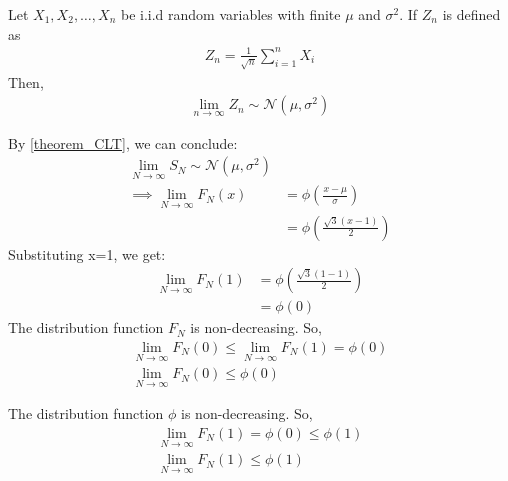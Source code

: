 \documentclass[journal,12pt,twocolumn]{IEEEtran}
\begin{document}
\begin{theorem}\label{theorem_CLT}
Let $X_1,X_2,\dots,X_n$ be i.i.d random variables with finite $\mu$ and $\sigma^2$. If $Z_n$ is defined as
\begin{align}
  Z_n = \frac{1}{\sqrt{n}} \sum_{i=1}^n X_i
 \end{align}
Then,
\begin{align}
   \lim_{n \to \infty} Z_n \sim \mathcal N(\mu,\sigma^2)
\end{align}

\end{theorem}
By \eqref{theorem_CLT}, we can conclude:
\begin{align}
\lim_{N\to\infty} S_N \sim \mathcal N(\mu,\sigma^2)\\
\implies \lim_{N\to\infty} F_N(x) &= \phi\left(\frac{x-\mu}{\sigma}\right)\\
&= \phi\left(\frac{\sqrt{3}(x-1)}{2}\right)
\end{align}
Substituting x=1, we get:
\begin{align}
    \lim_{N\to\infty} F_N(1) &=  \phi\left(\frac{\sqrt{3}(1-1)}{2}\right)\\
    &= \phi(0)
\end{align}
The distribution function $F_N$ is non-decreasing. So,
\begin{align}
    \lim_{N\to\infty} F_N(0) \leq \lim_{N\to\infty} F_N(1) = \phi(0)\\
    \lim_{N\to\infty} F_N(0) \leq \phi(0)
\end{align}

The distribution function $\phi$ is non-decreasing. So,
\begin{align}
    \lim_{N\to\infty} F_N(1) = \phi(0) \leq \phi(1)\\
    \lim_{N\to\infty} F_N(1) \leq \phi(1)
\end{align}
\bigskip
{}
\end{document}
